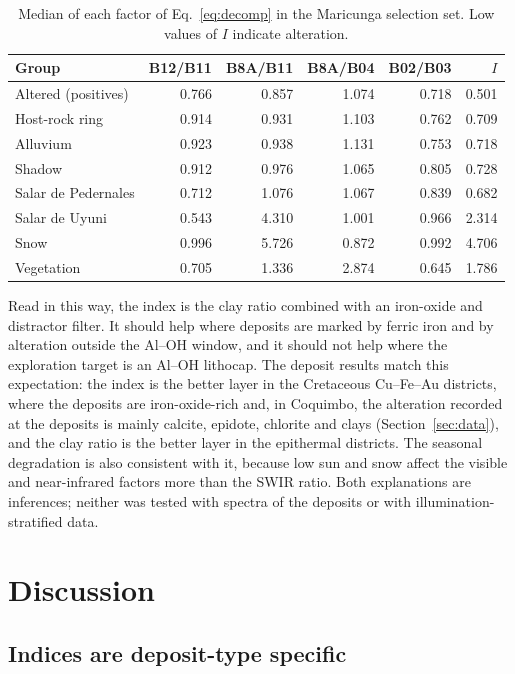 \documentclass[preprint,authoryear,number]{elsarticle}
\begin{document}
\begin{table}[ht]
\centering
\caption{Median of each factor of Eq.~\ref{eq:decomp} in the Maricunga selection set. Low values of $I$ indicate alteration.}
\label{tab:terms}
\small
\begin{tabular}{lrrrrr}
\toprule
Group & B12/B11 & B8A/B11 & B8A/B04 & B02/B03 & $I$ \\
\midrule
Altered (positives) & 0.766 & 0.857 & 1.074 & 0.718 & 0.501 \\
Host-rock ring & 0.914 & 0.931 & 1.103 & 0.762 & 0.709 \\
Alluvium & 0.923 & 0.938 & 1.131 & 0.753 & 0.718 \\
Shadow & 0.912 & 0.976 & 1.065 & 0.805 & 0.728 \\
Salar de Pedernales & 0.712 & 1.076 & 1.067 & 0.839 & 0.682 \\
Salar de Uyuni & 0.543 & 4.310 & 1.001 & 0.966 & 2.314 \\
Snow & 0.996 & 5.726 & 0.872 & 0.992 & 4.706 \\
Vegetation & 0.705 & 1.336 & 2.874 & 0.645 & 1.786 \\
\bottomrule
\end{tabular}
\end{table}

Read in this way, the index is the clay ratio combined with an iron-oxide and distractor filter. It should help where deposits are marked by ferric iron and by alteration outside the Al--OH window, and it should not help where the exploration target is an Al--OH lithocap. The deposit results match this expectation: the index is the better layer in the Cretaceous Cu--Fe--Au districts, where the deposits are iron-oxide-rich \citep{Sillitoe2003} and, in Coquimbo, the alteration recorded at the deposits is mainly calcite, epidote, chlorite and clays (Section~\ref{sec:data}), and the clay ratio is the better layer in the epithermal districts. The seasonal degradation is also consistent with it, because low sun and snow affect the visible and near-infrared factors more than the SWIR ratio. Both explanations are inferences; neither was tested with spectra of the deposits or with illumination-stratified data.

\section{Discussion}
\label{sec:discussion}

\subsection{Indices are deposit-type specific}
\end{document}
